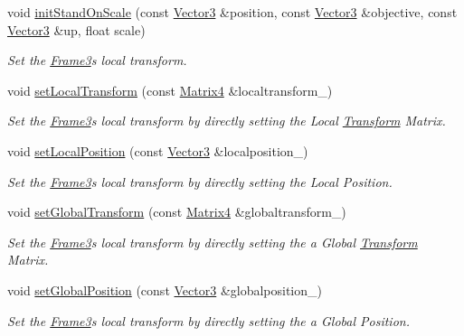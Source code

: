 \begin{DoxyCompactItemize}
void \hyperlink{class_magnum_1_1_frame3_a0a6885f2b665329b4f6e5cc1b9abe28e}{init\+Stand\+On\+Scale} (const \hyperlink{class_magnum_1_1_vector3}{Vector3} \&position, const \hyperlink{class_magnum_1_1_vector3}{Vector3} \&objective, const \hyperlink{class_magnum_1_1_vector3}{Vector3} \&up, float scale)
\begin{DoxyCompactList}\small\item\em Set the \hyperlink{class_magnum_1_1_frame3}{Frame3}\textquotesingle{}s local transform. \end{DoxyCompactList}\item 
void \hyperlink{class_magnum_1_1_frame3_a83afcd522b770d9f91539a5edd120b71}{set\+Local\+Transform} (const \hyperlink{class_magnum_1_1_matrix4}{Matrix4} \&localtransform\+\_\+)
\begin{DoxyCompactList}\small\item\em Set the \hyperlink{class_magnum_1_1_frame3}{Frame3}\textquotesingle{}s local transform by directly setting the Local \hyperlink{class_magnum_1_1_transform}{Transform} Matrix. \end{DoxyCompactList}\item 
void \hyperlink{class_magnum_1_1_frame3_a4d7f2932c763df5cbb901264021113d1}{set\+Local\+Position} (const \hyperlink{class_magnum_1_1_vector3}{Vector3} \&localposition\+\_\+)
\begin{DoxyCompactList}\small\item\em Set the \hyperlink{class_magnum_1_1_frame3}{Frame3}\textquotesingle{}s local transform by directly setting the Local Position. \end{DoxyCompactList}\item 
void \hyperlink{class_magnum_1_1_frame3_a7e8615aa5b044ecc068c0ac2ecf1d764}{set\+Global\+Transform} (const \hyperlink{class_magnum_1_1_matrix4}{Matrix4} \&globaltransform\+\_\+)
\begin{DoxyCompactList}\small\item\em Set the \hyperlink{class_magnum_1_1_frame3}{Frame3}\textquotesingle{}s local transform by directly setting the a Global \hyperlink{class_magnum_1_1_transform}{Transform} Matrix. \end{DoxyCompactList}\item 
void \hyperlink{class_magnum_1_1_frame3_a6b3168f32b01c1cc8b12eebaf5c24c68}{set\+Global\+Position} (const \hyperlink{class_magnum_1_1_vector3}{Vector3} \&globalposition\+\_\+)
\begin{DoxyCompactList}\small\item\em Set the \hyperlink{class_magnum_1_1_frame3}{Frame3}\textquotesingle{}s local transform by directly setting the a Global Position. \end{DoxyCompactList}\item 

\end{DoxyCompactItemize}

